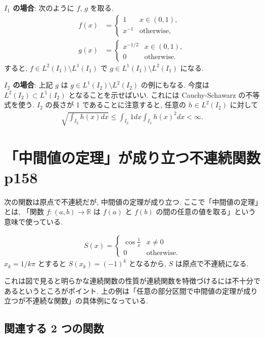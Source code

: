 \documentclass[openany, a4paper, oneside]{book}
\theoremstyle{break}
\theoremstyle{breakdefn}
\begin{document}
\textbf{$I_1$ の場合}:
次のように $f$, $g$ を取る.
\begin{align}
 f (x)
 &=
 \begin{cases}
  1      & x \in (0, 1), \\
  x^{-1} & \mathrm{otherwise},
 \end{cases} \\
 g (x)
 &=
 \begin{cases}
  x^{-1/2} & x \in (0,1), \\
  0        & \mathrm{otherwise}.
 \end{cases}
\end{align}
すると, $f \in L^2 (I_1) \setminus L^1 (I_1)$ で $g \in L^1 (I_1) \setminus L^2 (I_1)$ になる.

\textbf{$I_2$ の場合}:
上記 $g$ は $g \in L^1 (I_2) \setminus L^2 (I_2)$ の例にもなる.
今度は $L^2 (I_2) \subset L^1 (I_2)$ となることを示せばいい.
これには Cauchy-Schawarz の不等式を使う.
$I_2$ の長さが 1 であることに注意すると, 任意の $h \in L^2 (I_2)$ に対して
\begin{align}
 \sqrt{ \int_{I_2} h (x) dx}
 \leq
 \int_{I_2} 1 dx \int_{I_2} h (x)^2 dx < \infty.
\end{align}
\section{「中間値の定理」が成り立つ不連続関数 \cite{WilliamDumham1} p158}
\label{sec-11-3-10}

次の関数は原点で不連続だが, 中間値の定理が成り立つ.
ここで「中間値の定理」とは, 「関数 $f \colon (a, b) \to \mathbb{R}$ は $f (a)$ と $f (b)$ の間の任意の値を取る」という意味で使っている.

\begin{align}
 S (x)
 =
 \begin{cases}
  \cos \frac{1}{x} & x \neq 0 \\
  0 & \mathrm{otherwise}.
 \end{cases}
\end{align}
$x_k = 1 / k \pi$ とすると $S (x_k) = (-1)^k$ となるから, $S$ は原点で不連続になる.

これは図で見ると明らかな連続関数の性質が連続関数を特徴づけるには不十分であるというところがポイント.
上の例は「任意の部分区間で中間値の定理が成り立つが不連続な関数」の具体例になっている.
\subsection{関連する 2 つの関数}
\label{sec-11-3-10-1}
\end{document}
